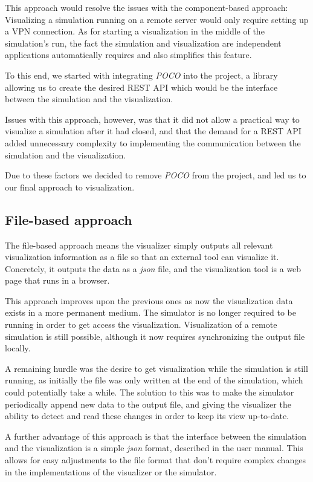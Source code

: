 \documentclass[a4paper,12pt]{article}
\begin{document}
This approach would resolve the issues with the component-based approach: Visualizing a simulation running on a remote server would only require setting up a VPN connection. As for starting a visualization in the middle of the simulation's run, the fact the simulation and visualization are independent applications automatically requires and also simplifies this feature.

To this end, we started with integrating \textit{POCO} into the project, a library allowing us to create the desired REST API which would be the interface between the simulation and the visualization.

Issues with this approach, however, was that it did not allow a practical way to visualize a simulation after it had closed, and that the demand for a REST API added unnecessary complexity to implementing the communication between the simulation and the visualization.

Due to these factors we decided to remove \textit{POCO} from the project, and led us to our final approach to visualization.

\subsection{File-based approach}
The file-based approach means the visualizer simply outputs all relevant visualization information as a file so that an external tool can visualize it. Concretely, it outputs the data as a \textit{json} file, and the visualization tool is a web page that runs in a browser.

This approach improves upon the previous ones as now the visualization data exists in a more permanent medium. The simulator is no longer required to be running in order to get access the visualization. Visualization of a remote simulation is still possible, although it now requires synchronizing the output file locally.

A remaining hurdle was the desire to get visualization while the simulation is still running, as initially the file was only written at the end of the simulation, which could potentially take a while. The solution to this was to make the simulator periodically append new data to the output file, and giving the visualizer the ability to detect and read these changes in order to keep its view up-to-date.

A further advantage of this approach is that the interface between the simulation and the visualization is a simple \textit{json} format, described in the user manual. This allows for easy adjustments to the file format that don't require complex changes in the implementations of the visualizer or the simulator.
\end{document}

